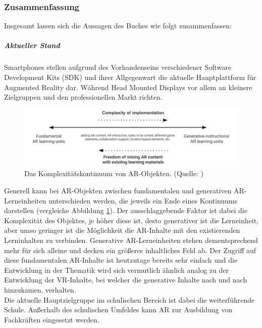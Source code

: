 \subsubsection{Zusammenfassung}
Insgesamt lassen sich die Aussagen des Buches wie folgt zusammenfassen:
\subparagraph{Aktueller Stand}
Smartphones stellen aufgrund des Vorhandenseins verschiedener Software Development Kits (SDK) und ihrer Allgegenwart die aktuelle Hauptplattform für Augmented Reality dar. Während Head Mounted Displays vor allem an kleinere Zielgruppen und den professionellen Markt richten. \citep[Kapitel 1.2]{geroimenko:ar-in-education}\\
\begin{figure}
\centering
\includegraphics[width=1.0\textwidth]{Abbildungen/ar-object-continuum.png}
\caption[Komplexitätskontinuum von AR-Objekten]{Das Komplexitätskontinuum von AR-Objekten. (Quelle: \cite[S. 9]{geroimenko:ar-in-education})}
\label{fig:komplexitätskontinuum}
\end{figure}
Generell kann bei AR-Objekten zwischen fundamentalen und generativen AR-Lerneinheiten unterschieden werden, die jeweils ein Ende eines Kontinuums darstellen (vergleiche Abbildung \ref{fig:komplexitätskontinuum}).
Der ausschlaggebende Faktor ist dabei die Komplexität des Objektes, je höher diese ist, desto generativer ist die Lerneinheit, aber umso geringer ist die Möglichkeit die AR-Inhalte mit den existierenden Lerninhalten zu verbinden. 
Generative AR-Lerneinheiten stehen dementsprechend mehr für sich alleine und decken ein größeres inhaltliches Feld ab.
Der Zugriff auf diese fundamentalen AR-Inhalte ist heutzutage bereits sehr einfach und die Entwicklung in der Thematik wird sich vermutlich ähnlich analog zu der Entwicklung der VR-Inhalte, bei welcher die generative Inhalte nach und nach hinzukamen, verhalten.\citep[Kapitel 1.3]{geroimenko:ar-in-education}\\
Die aktuelle Hauptzielgruppe im schulischen Bereich ist dabei die weiterführende Schule. Außerhalb des schulischen Umfeldes kann AR zur Ausbildung von Fachkräften eingesetzt werden. \citep[Kapitel 1.5]{geroimenko:ar-in-education}

